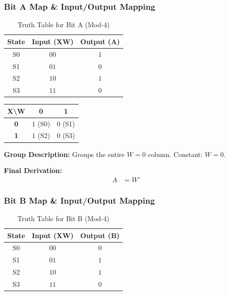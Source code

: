 \documentclass[journal,12pt,onecolumn]{IEEEtran}
\begin{document}
		\vspace{1em}
		\subsubsection{Bit A Map \& Input/Output Mapping}
		
		\begin{table}[H]
			\centering
			\begin{tabular}{|c|c|c|}
				\hline
				\textbf{State} & \textbf{Input (XW)} & \textbf{Output (A)} \\
				\hline
				S0 & $00$ & $1$ \\
				\hline
				S1 & $01$ & $0$ \\
				\hline
				S2 & $10$ & $1$ \\
				\hline
				S3 & $11$ & $0$ \\
				\hline
			\end{tabular}
			\caption{Truth Table for Bit A (Mod-4)}
		\end{table}
		
		\begin{table}[H]
			\centering
			\begin{tabular}{|c|c|c|}
				\hline
				\textbf{X\textbackslash W} & \textbf{0} & \textbf{1} \\
				\hline
				\textbf{0} & \cellcolor{grpRed}$1$ (S0) & $0$ (S1) \\
				\hline
				\textbf{1} & \cellcolor{grpRed}$1$ (S2) & $0$ (S3) \\
				\hline
			\end{tabular}
		\end{table}
		
		\begin{justify}
			\textbf{Group Description:} Groups the entire $W=0$ column. Constant: $W=0$.
			
			\textbf{Final Derivation:}
			\begin{align}
				A &= W'
			\end{align}
		\end{justify}
		
		\vspace{1em}
		\subsubsection{Bit B Map \& Input/Output Mapping}
		
		\begin{table}[H]
			\centering
			\begin{tabular}{|c|c|c|}
				\hline
				\textbf{State} & \textbf{Input (XW)} & \textbf{Output (B)} \\
				\hline
				S0 & $00$ & $0$ \\
				\hline
				S1 & $01$ & $1$ \\
				\hline
				S2 & $10$ & $1$ \\
				\hline
				S3 & $11$ & $0$ \\
				\hline
			\end{tabular}
			\caption{Truth Table for Bit B (Mod-4)}
		\end{table}
		
\end{document}
